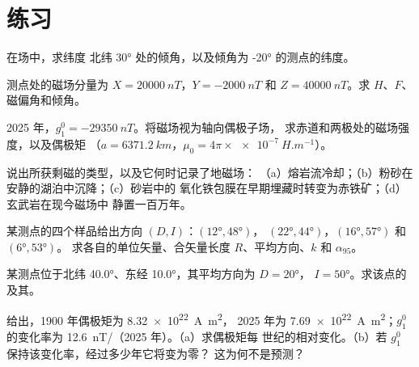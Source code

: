 \section{练习}

\begin{exercise}[$\star$]\label{exo:b3:palaeomagnetism:1}
在场中，求纬度
北纬 \ang{30} 处的倾角，以及倾角为 \ang{-20} 的测点的纬度。
\end{exercise}

\begin{exercise}[$\star$]\label{exo:b3:palaeomagnetism:2}
测点处的磁场分量为 $X = \qty{20000}{nT}$，$Y =
\qty{-2000}{nT}$ 和 $Z = \qty{40000}{nT}$。求 $H$、$F$、
磁偏角和倾角。
\end{exercise}

\begin{exercise}[$\star$]\label{exo:b3:palaeomagnetism:3}
2025 年，$g_1^0 = \qty{-29350}{nT}$。将磁场视为轴向偶极子场，
求赤道和两极处的磁场强度，以及偶极矩
（$a = \qty{6371.2}{km}$，$\mu_0 = 4\pi\times\qty{e-7}{H.m^{-1}}$）。
\end{exercise}

\begin{exercise}[$\star$]\label{exo:b3:palaeomagnetism:4}
说出所获剩磁的类型，以及它何时记录了地磁场：
（a）熔岩流冷却；（b）粉砂在安静的湖泊中沉降；（c）砂岩中的
氧化铁包膜在早期埋藏时转变为赤铁矿；（d）玄武岩在现今磁场中
静置一百万年。
\end{exercise}

\begin{exercise}[$\star\star$]\label{exo:b3:palaeomagnetism:5}
某测点的四个样品给出方向 $(D, I)$：$(\ang{12}, \ang{48})$，
$(\ang{22}, \ang{44})$，$(\ang{16}, \ang{57})$ 和 $(\ang{6}, \ang{53})$。
求各自的单位矢量、合矢量长度 $R$、平均方向、$k$
和 $\alpha_{95}$。
\end{exercise}

\begin{exercise}[$\star\star$]\label{exo:b3:palaeomagnetism:6}
某测点位于北纬 \ang{40.0}、东经 \ang{10.0}，其平均方向为 $D = \ang{20}$，
$I = \ang{50}$。求该点的及其。
\end{exercise}

\begin{exercise}[$\star\star$]\label{exo:b3:palaeomagnetism:7}
给出，1900 年偶极矩为 \qty{8.32e22}{A.m^2}，
2025 年为 \qty{7.69e22}{A.m^2}；$g_1^0$ 的变化率为
\qty{+12.6}{nT/}（2025 年）。（a）求偶极矩每
世纪的相对变化。（b）若 $g_1^0$ 保持该变化率，经过多少年它将变为零？
这为何不是预测？
\end{exercise}

